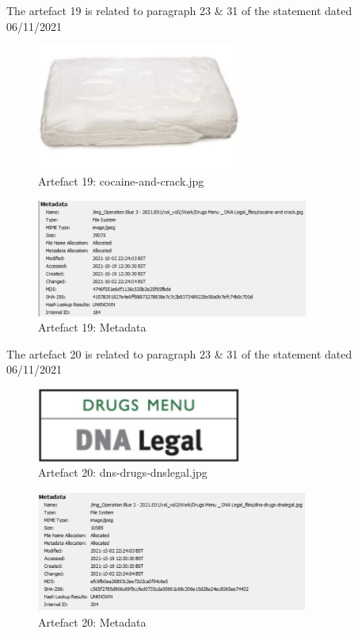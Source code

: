 The artefact 19 is related to paragraph 23 \& 31 of the statement dated
06/11/2021
\begin{figure}[H]
  \centering
  \includegraphics[width=0.6\textwidth]{figures/artefact19}
  \caption{Artefact 19: cocaine-and-crack.jpg}
  \label{f:artefact19}
\end{figure}
\begin{figure}[H]
  \centering
  \includegraphics[width=0.8\textwidth]{figures/meta19}
  \caption{Artefact 19: Metadata}
  \label{f:meta19}
\end{figure}
The artefact 20 is related to paragraph 23 \& 31 of the statement
dated 06/11/2021
\begin{figure}[H]
  \centering
  \includegraphics[width=0.6\textwidth]{figures/artefact20}
  \caption{Artefact 20: dns-drugs-dnslegal.jpg}
  \label{f:artefact20}
\end{figure}
\begin{figure}[H]
  \centering
  \includegraphics[width=0.8\textwidth]{figures/meta20}
  \caption{Artefact 20: Metadata}
  \label{f:meta20}
\end{figure}
